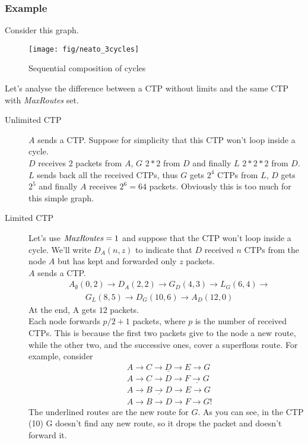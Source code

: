 \documentclass[a4paper]{article}
\begin{document}
\subsubsection*{Example}
Consider this graph.
\begin{figure}[h]
	\begin{center}
		\texttt{[image: fig/neato\_3cycles]}
	\end{center}
	\caption{Sequential composition of cycles}
	\label{fig:q2_scalability_example}
\end{figure}
Let's analyse the difference between a CTP without limits and the same CTP
with \emph{MaxRoutes} set.
\begin{description}
	\item[Unlimited CTP] $A$ sends a CTP. Suppose for simplicity that
		this CTP won't loop inside a cycle.\\
		$D$ receives $2$ packets from $A$, $G$ $2*2$ from $D$ and
		finally $L$ $2*2*2$ from $D$.\\
		$L$ sends back all the received CTPs, thus $G$ gets $2^4$ CTPs
		from $L$, $D$ gets $2^5$ and finally $A$ receives $2^6=64$
		packets.
		Obviously this is too much for this simple graph.
	\item[Limited CTP] Let's use $\textrm{\emph{MaxRoutes}}=1$ and suppose
		that the CTP won't loop inside a cycle. We'll write
		$D_A(n,z)$ to indicate that $D$ received $n$ CTPs from the node
		$A$ but has kept and forwarded only $z$ packets.\\
		$A$ sends a CTP.\\
		\begin{align*}
			&A_{\emptyset}(0,2) \rightarrow	D_A(2,2)\rightarrow
			G_D(4,3) \rightarrow L_G(6,4) \rightarrow \\
			& \qquad G_L(8,5) \rightarrow D_G(10, 6) \rightarrow
			A_D(12, 0)
		\end{align*}
		At the end, A gets $12$ packets.\\
		Each node forwards $p/2+1$ packets, where $p$ is the number of
		received CTPs. This is because the first two packets give to
		the node a new route, while the other two, and the successive
		ones, cover a superflous route. For example, consider
		\begin{align}	
			&\underline{A \rightarrow  C \rightarrow D \rightarrow
			E \rightarrow  G} \label{eq:d1}\\
			&A \rightarrow  C \rightarrow D \rightarrow
			\underline{F \rightarrow  G} \label{eq:d2}\\
			&A \rightarrow  \underline{B \rightarrow D} \rightarrow
			E \rightarrow  G \label{eq:d3}\\
			&A \rightarrow B \rightarrow D \rightarrow F
			\rightarrow  G \mathbb{!}\label{eq:d4}
		\end{align}
		The underlined routes are the new route for $G$. As you can
		see, in the CTP (10) G doesn't find any new route, so
		it drops the packet and doesn't forward it.
	\end{description}
\end{document}
